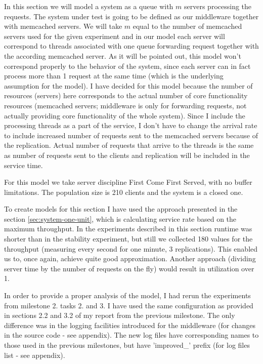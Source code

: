 \documentclass[11pt]{article}
\begin{document}
In this section we will model a system as a queue with $m$ servers processing the requests. The system under test is going to be defined as our middleware together with memcached servers. We will take $m$ equal to the number of memcached servers used for the given experiment and in our model each server will correspond to threads associated with one queue forwarding request together with the according memcached server. As it will be pointed out, this model won't correspond properly to the behavior of the system, since each server can in fact process more than 1 request at the same time (which is the underlying assumption for the model). I have decided for this model because the number of resources (servers) here corresponds to the actual number of core functionality resources (memcached servers; middleware is only for forwarding requests, not actually providing core functionality of the whole system). Since I include the processing threads as a part of the service, I don't have to change the arrival rate to include increased number of requests sent to the memcached servers because of the replication. Actual number of requests that arrive to the threads is the same as number of requests sent to the clients and replication will be included in the service time.

For this model we take server discipline First Come First Served, with no buffer limitations. The population size is 210 clients and the system is a closed one.

To create models for this section I have used the approach presented in the section \ref{sec:system-one-unit}, which is calculating service rate based on the maximum throughput. In the experiments described in this section runtime was shorter than in the stability experiment, but still we collected 180 values for the throughput (measuring every second for one minute, 3 replications). This enabled us to, once again, achieve quite good approximation. Another approach (dividing server time by the number of requests on the fly) would result in utilization over 1.

In order to provide a proper analysis of the model, I had rerun the experiments from milestone 2. tasks 2. and 3. I have used the same configuration as provided in sections 2.2 and 3.2 of my report from the previous milestone. The only difference was in the logging facilities introduced for the middleware (for changes in the source code - see appendix). The new log files have corresponding names to those used in the previous milestones, but have 'improved\_' prefix (for log files list - see appendix).
\end{document}
